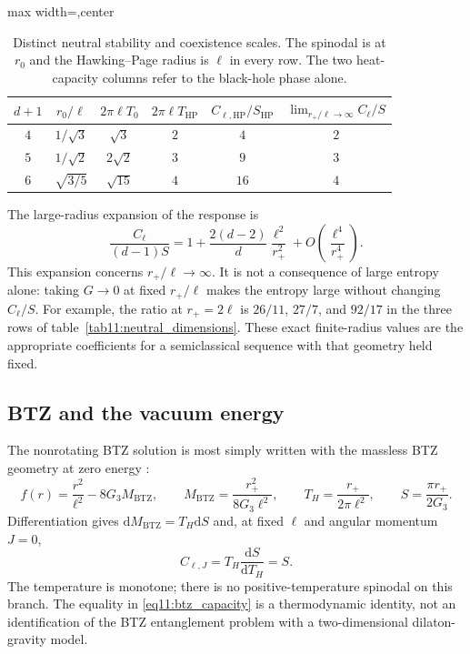\documentclass[11pt,letterpaper]{article}
\newcommand{\dd}{\mathrm{d}}
\theoremstyle{plain}
\theoremstyle{definition}
\theoremstyle{remark}
\begin{document}
\begin{table}[tbp]
 \centering
 \caption{Distinct neutral stability and coexistence scales.  The
 spinodal is at $r_0$ and the Hawking--Page radius is $\ell$ in every
 row.  The two heat-capacity columns refer to the black-hole phase
 alone.}
 \label{tab11:neutral_scales}
 \begin{adjustbox}{max width=\textwidth,center}
 \begin{tabular}{@{}cccccc@{}}
 \toprule
 $d+1$ & $r_0/\ell$ & $2\pi\ell T_0$ & $2\pi\ell T_{\mathrm{HP}}$
 & $C_{\ell,\mathrm{HP}}/S_{\mathrm{HP}}$
 & $\lim_{r_+/\ell\to\infty}C_\ell/S$\\
 \midrule
 $4$ & $1/\sqrt3$ & $\sqrt3$ & $2$ & $4$ & $2$\\[3pt]
 $5$ & $1/\sqrt2$ & $2\sqrt2$ & $3$ & $9$ & $3$\\[3pt]
 $6$ & $\sqrt{3/5}$ & $\sqrt{15}$ & $4$ & $16$ & $4$\\
 \bottomrule
 \end{tabular}
 \end{adjustbox}
\end{table}

The large-radius expansion of the response is
\begin{equation}
 \frac{C_\ell}{(d-1)S}
 =1+\frac{2(d-2)}{d}\frac{\ell^2}{r_+^2}
       +O\!\left(\frac{\ell^4}{r_+^4}\right).
 \label{eq11:large_radius_capacity}
\end{equation}
This expansion concerns $r_+/\ell\to\infty$.  It is not a consequence of
large entropy alone: taking $G\to0$ at fixed $r_+/\ell$ makes the entropy
large without changing $C_\ell/S$.  For example, the ratio at
$r_+=2\ell$ is $26/11$, $27/7$, and $92/17$ in the three rows of
table~\ref{tab11:neutral_dimensions}.  These exact finite-radius values
are the appropriate coefficients for a semiclassical sequence with that
geometry held fixed.

\subsection{BTZ and the vacuum energy}
\label{app11:btz}

The nonrotating BTZ solution is most simply written with the massless
BTZ geometry at zero energy \cite{banados1992}:
\begin{equation}
 f(r)=\frac{r^2}{\ell^2}-8G_3M_{\mathrm{BTZ}},\qquad
 M_{\mathrm{BTZ}}=\frac{r_+^2}{8G_3\ell^2},\qquad
 T_H=\frac{r_+}{2\pi\ell^2},\qquad
 S=\frac{\pi r_+}{2G_3}.
 \label{eq11:btz_thermodynamics}
\end{equation}
Differentiation gives $\dd M_{\mathrm{BTZ}}=T_H\dd S$ and, at fixed
$\ell$ and angular momentum $J=0$,
\begin{equation}
 C_{\ell,J}=T_H\frac{\dd S}{\dd T_H}=S.
 \label{eq11:btz_capacity}
\end{equation}
The temperature is monotone; there is no positive-temperature spinodal
on this branch.  The equality in \eqref{eq11:btz_capacity} is a
thermodynamic identity, not an identification of the BTZ entanglement
problem with a two-dimensional dilaton-gravity model.
\end{document}
